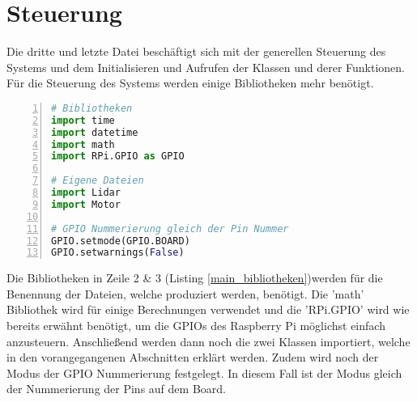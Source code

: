 \section{Steuerung}
Die dritte und letzte Datei beschäftigt sich mit der generellen Steuerung des Systems und dem Initialisieren und Aufrufen der Klassen und derer Funktionen.\\
Für die Steuerung des Systems werden einige Bibliotheken mehr benötigt.
\begin{lstlisting}[caption={Bibliotheken zur Steuerung des Systems}, language={Python}, label={main_bibliotheken}, numbers=left]
# Bibliotheken
import time
import datetime
import math
import RPi.GPIO as GPIO

# Eigene Dateien
import Lidar
import Motor

# GPIO Nummerierung gleich der Pin Nummer
GPIO.setmode(GPIO.BOARD)
GPIO.setwarnings(False)
\end{lstlisting}
Die Bibliotheken in Zeile 2 \& 3 (Listing \ref{main_bibliotheken})werden für die Benennung der Dateien, welche produziert werden, benötigt. Die 'math' Bibliothek wird für einige Berechnungen verwendet und die 'RPi.GPIO' wird wie bereits erwähnt benötigt, um die \acp{GPIO} des Raspberry Pi möglichst einfach anzusteuern. Anschließend werden dann noch die zwei Klassen importiert, welche in den vorangegangenen Abschnitten erklärt werden. Zudem wird noch der Modus der \ac{GPIO} Nummerierung festgelegt. In diesem Fall ist der Modus gleich der Nummerierung der Pins auf dem Board. \\

